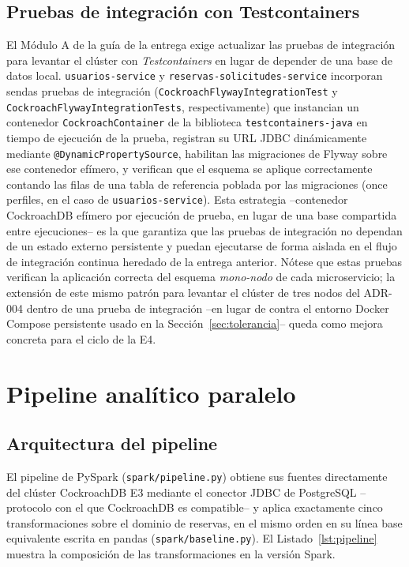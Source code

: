 \documentclass[10pt,twocolumn]{article}
\begin{document}
\subsection{Pruebas de integración con Testcontainers}

El Módulo A de la guía de la entrega exige actualizar las pruebas de
integración para levantar el clúster con \emph{Testcontainers} en lugar de
depender de una base de datos local. \texttt{usuarios-service} y
\texttt{reservas-solicitudes-service} incorporan sendas pruebas de
integración (\texttt{CockroachFlywayIntegrationTest} y
\texttt{CockroachFlywayIntegrationTests}, respectivamente) que instancian
un contenedor \texttt{CockroachContainer} de la biblioteca
\texttt{testcontainers-java} en tiempo de ejecución de la prueba,
registran su URL JDBC dinámicamente mediante
\texttt{@DynamicPropertySource}, habilitan las migraciones de Flyway sobre
ese contenedor efímero, y verifican que el esquema se aplique
correctamente contando las filas de una tabla de referencia poblada por
las migraciones (once perfiles, en el caso de
\texttt{usuarios-service}). Esta estrategia --contenedor CockroachDB
efímero por ejecución de prueba, en lugar de una base compartida entre
ejecuciones-- es la que garantiza que las pruebas de integración no
dependan de un estado externo persistente y puedan ejecutarse de forma
aislada en el flujo de integración continua heredado de la entrega
anterior. Nótese que estas pruebas verifican la aplicación correcta del
esquema \emph{mono-nodo} de cada microservicio; la extensión de este mismo
patrón para levantar el clúster de tres nodos del ADR-004 dentro de una
prueba de integración --en lugar de contra el entorno Docker Compose
persistente usado en la Sección~\ref{sec:tolerancia}-- queda como mejora
concreta para el ciclo de la E4.

\section{Pipeline analítico paralelo}
\label{sec:pipeline}

\subsection{Arquitectura del pipeline}

El pipeline de PySpark (\texttt{spark/pipeline.py}) obtiene sus fuentes
directamente del clúster CockroachDB E3 mediante el conector JDBC de
PostgreSQL --protocolo con el que CockroachDB es compatible-- y aplica
exactamente cinco transformaciones sobre el dominio de reservas, en el
mismo orden en su línea base equivalente escrita en pandas
(\texttt{spark/baseline.py}). El Listado~\ref{lst:pipeline} muestra la
composición de las transformaciones en la versión Spark.
\end{document}
